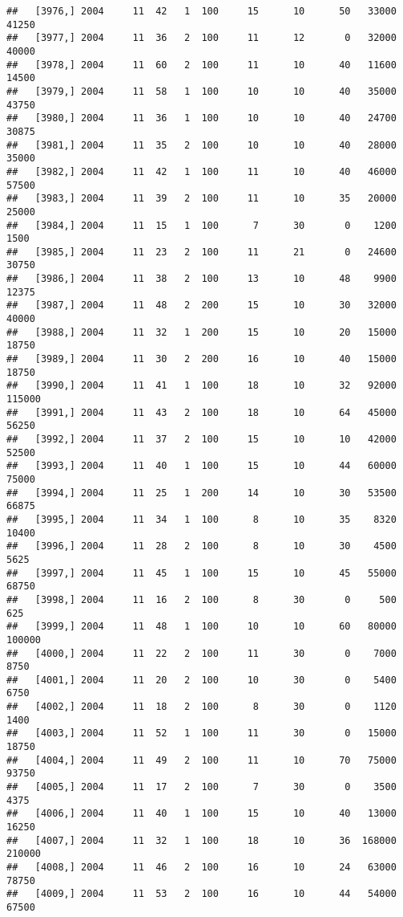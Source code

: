 \documentclass{article}\usepackage[]{graphicx}\usepackage[]{color}
\makeatletter
\newenvironment{kframe}{%
 \def\at@end@of@kframe{}%
 \ifinner\ifhmode%
  \def\at@end@of@kframe{\end{minipage}}%
  \begin{minipage}{\columnwidth}%
 \fi\fi%
 \def\FrameCommand##1{\hskip\@totalleftmargin \hskip-\fboxsep
 \colorbox{shadecolor}{##1}\hskip-\fboxsep
     \hskip-\linewidth \hskip-\@totalleftmargin \hskip\columnwidth}%
 \MakeFramed {\advance\hsize-\width
   \@totalleftmargin\z@ \linewidth\hsize
   \@setminipage}}%
 {\par\unskip\endMakeFramed%
 \at@end@of@kframe}
\newenvironment{knitrout}{}{} %
\makeatother
\begin{document}
\begin{knitrout}
\begin{kframe}
\begin{verbatim}
##   [3976,] 2004     11  42   1  100     15      10      50   33000   41250
##   [3977,] 2004     11  36   2  100     11      12       0   32000   40000
##   [3978,] 2004     11  60   2  100     11      10      40   11600   14500
##   [3979,] 2004     11  58   1  100     10      10      40   35000   43750
##   [3980,] 2004     11  36   1  100     10      10      40   24700   30875
##   [3981,] 2004     11  35   2  100     10      10      40   28000   35000
##   [3982,] 2004     11  42   1  100     11      10      40   46000   57500
##   [3983,] 2004     11  39   2  100     11      10      35   20000   25000
##   [3984,] 2004     11  15   1  100      7      30       0    1200    1500
##   [3985,] 2004     11  23   2  100     11      21       0   24600   30750
##   [3986,] 2004     11  38   2  100     13      10      48    9900   12375
##   [3987,] 2004     11  48   2  200     15      10      30   32000   40000
##   [3988,] 2004     11  32   1  200     15      10      20   15000   18750
##   [3989,] 2004     11  30   2  200     16      10      40   15000   18750
##   [3990,] 2004     11  41   1  100     18      10      32   92000  115000
##   [3991,] 2004     11  43   2  100     18      10      64   45000   56250
##   [3992,] 2004     11  37   2  100     15      10      10   42000   52500
##   [3993,] 2004     11  40   1  100     15      10      44   60000   75000
##   [3994,] 2004     11  25   1  200     14      10      30   53500   66875
##   [3995,] 2004     11  34   1  100      8      10      35    8320   10400
##   [3996,] 2004     11  28   2  100      8      10      30    4500    5625
##   [3997,] 2004     11  45   1  100     15      10      45   55000   68750
##   [3998,] 2004     11  16   2  100      8      30       0     500     625
##   [3999,] 2004     11  48   1  100     10      10      60   80000  100000
##   [4000,] 2004     11  22   2  100     11      30       0    7000    8750
##   [4001,] 2004     11  20   2  100     10      30       0    5400    6750
##   [4002,] 2004     11  18   2  100      8      30       0    1120    1400
##   [4003,] 2004     11  52   1  100     11      30       0   15000   18750
##   [4004,] 2004     11  49   2  100     11      10      70   75000   93750
##   [4005,] 2004     11  17   2  100      7      30       0    3500    4375
##   [4006,] 2004     11  40   1  100     15      10      40   13000   16250
##   [4007,] 2004     11  32   1  100     18      10      36  168000  210000
##   [4008,] 2004     11  46   2  100     16      10      24   63000   78750
##   [4009,] 2004     11  53   2  100     16      10      44   54000   67500

\end{verbatim}
\end{kframe}
\end{knitrout}
\end{document}
